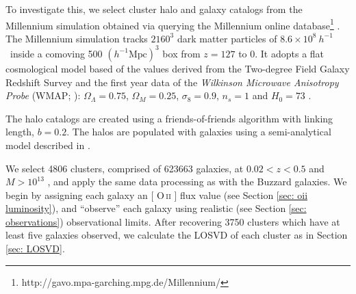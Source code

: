 \documentclass[fleqn,usenatbib]{mnras}
\makeatletter
\DeclareRobustCommand{\ion}[2]{%
\relax\ifmmode
\ifx\testbx\f@series
{\mathbf{#1\,\mathsc{#2}}}\else
{\mathrm{#1\,\mathsc{#2}}}\fi
\else\textup{#1\,{\mdseries\textsc{#2}}}%
\fi}
\makeatother
\begin{document}
To investigate this, we select cluster halo and galaxy catalogs from the Millennium simulation \citep{Springel2005b} obtained via querying the Millennium online database\footnote{http://gavo.mpa-garching.mpg.de/Millennium/} \citep{Lemson2006}. The Millennium simulation tracks $2160^3$ dark matter particles of $8.6\times 10^8 ~h^{-1}$ \Msol\ inside a comoving 500 $(h^{-1} \mathrm{Mpc})^3$ box from $z=127$ to 0. It adopts a flat cosmological model based of the values derived from the Two-degree Field Galaxy Redshift Survey \citep{Colless2001} and the first year data of the \emph{Wilkinson Microwave Anisotropy Probe} (WMAP; \citealt{Spergel2003}): $\Omega_\Lambda = 0.75$, $\Omega_M = 0.25$, $\sigma_8 = 0.9$, $n_s = 1$ and $H_0= 73$ \kms \mpc. 

The halo catalogs are created using a friends-of-friends algorithm  with linking length, $b=0.2$. The halos are populated with galaxies using a semi-analytical model described in \cite{Croton2006, DeLucia2006, DeLucia2007a}. 

We select 4806 clusters, comprised of 623663 galaxies, at $0.02 < z < 0.5$ and $M > 10^{13}$ \Msol, and apply the same data processing as with the Buzzard galaxies. We begin by assigning each galaxy an [\ion{O}{ii}] flux value (see Section \ref{sec: oii luminosity}), and ``observe'' each galaxy using realistic (see Section \ref{sec: observations}) observational limits. After recovering 3750 clusters which have at least five galaxies observed, we calculate the LOSVD of each cluster as in Section \ref{sec: LOSVD}. 
\end{document}
